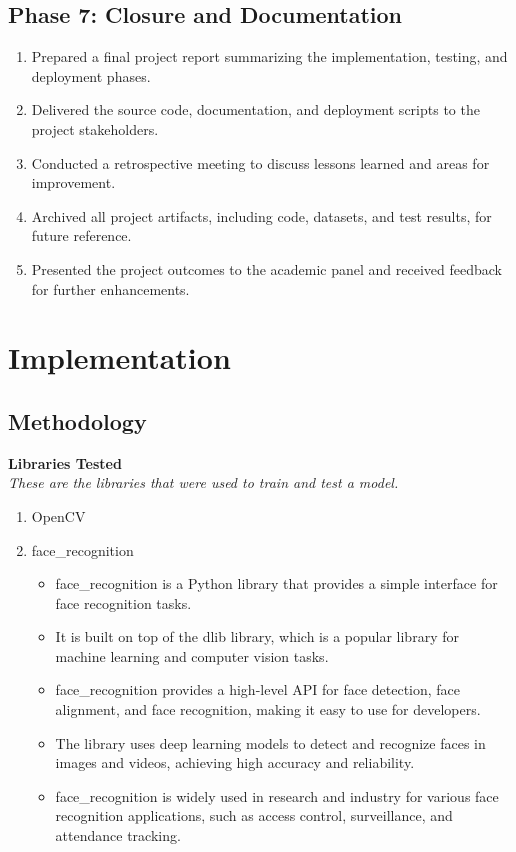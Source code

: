 \documentclass[openany]{report}
\begin{document}
\section{Phase 7: Closure and Documentation}

\begin{enumerate}
    \item Prepared a final project report summarizing the implementation, testing, and deployment phases.
    \item Delivered the source code, documentation, and deployment scripts to the project stakeholders.
    \item Conducted a retrospective meeting to discuss lessons learned and areas for improvement.
    \item Archived all project artifacts, including code, datasets, and test results, for future reference.
    \item Presented the project outcomes to the academic panel and received feedback for further enhancements.
\end{enumerate}

\chapter{Implementation}

\section{Methodology}
\textbf{Libraries Tested} \\
\textit{These are the libraries that were used to train and test a model.}
\begin{enumerate}
    \item OpenCV
    \item face\_recognition
          \begin{itemize}
              \item face\_recognition is a Python library that provides a simple interface for face recognition tasks.
              \item It is built on top of the dlib library, which is a popular library for machine learning and computer vision tasks.
              \item face\_recognition provides a high-level API for face detection, face alignment, and face recognition, making it easy to use for developers.
              \item The library uses deep learning models to detect and recognize faces in images and videos, achieving high accuracy and reliability.
              \item face\_recognition is widely used in research and industry for various face recognition applications, such as access control, surveillance, and attendance tracking.
          \end{itemize}
\end{enumerate}
\end{document}
